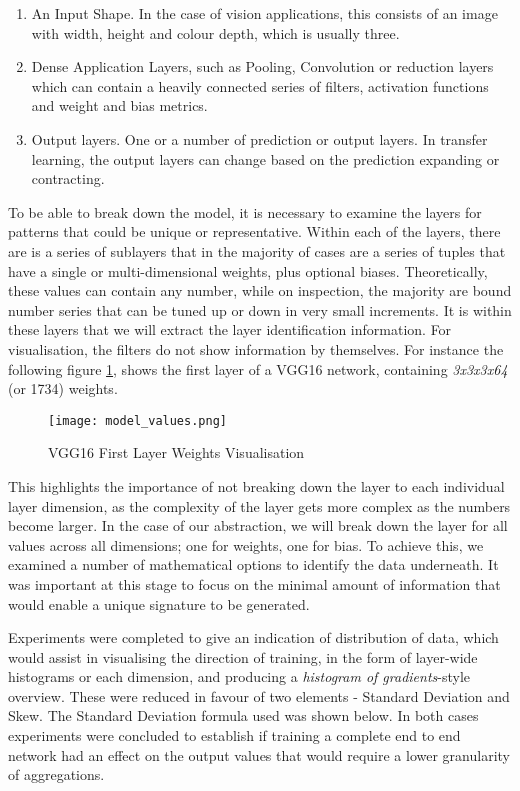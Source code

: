 \begin{enumerate}
\item An Input Shape. In the case of vision applications, this consists of an image with width, height and colour depth, which is usually three.
\item Dense Application Layers, such as Pooling, Convolution or reduction layers which can contain a heavily connected series of filters, activation functions and weight and bias metrics.
\item Output layers. One or a number of prediction or output layers. In transfer learning, the output layers can change based on the prediction expanding or contracting.
\end{enumerate}

To be able to break down the model, it is necessary to examine the layers for patterns that could be unique or representative. Within each of the layers, there are is a series of sublayers that in the majority of cases are a series of tuples that have a single or multi-dimensional weights, plus optional biases. Theoretically, these values can contain any number, while on inspection, the majority are bound number series that can be tuned up or down in very small increments. It is within these layers that we will extract the layer identification information. For visualisation, the filters do not show information by themselves. For instance the following figure \ref{fig:vggWeightVisualisation}, shows the first layer of a VGG16 network\cite{brownleeHowVisualizeFilters2019}, containing \textit{3x3x3x64} (or 1734) weights.

\begin{figure}[!ht]
    \centering
    \texttt{[image: model\_values.png]}
    \caption{VGG16 First Layer Weights Visualisation}
    \label{fig:vggWeightVisualisation}
\end{figure}

This highlights the importance of not breaking down the layer to each individual layer dimension, as the complexity of the layer gets more complex as the numbers become larger. In the case of our abstraction, we will break down the layer for all values across all dimensions; one for weights, one for bias. To achieve this, we examined a number of mathematical options to identify the data underneath. It was important at this stage to focus on the minimal amount of information that would enable a unique signature to be generated.

Experiments were completed to give an indication of distribution of data, which would assist in visualising the direction of training, in the form of layer-wide histograms or each dimension, and producing a \textit{histogram of gradients}-style overview. These were reduced in favour of two elements - Standard Deviation and Skew. The Standard Deviation formula used was shown below. In both cases experiments were concluded to establish if training a complete end to end network had an effect on the output values that would require a lower granularity of aggregations. 

